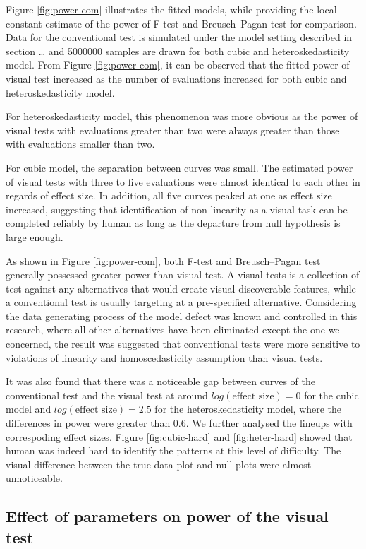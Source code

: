 \documentclass[]{interact}
\theoremstyle{plain}%
\theoremstyle{definition}
\theoremstyle{remark}
\begin{document}
Figure \ref{fig:power-com} illustrates the fitted models, while
providing the local constant estimate of the power of F-test and
Breusch--Pagan test for comparison. Data for the conventional test is
simulated under the model setting described in section \ldots{} and
5000000 samples are drawn for both cubic and heteroskedasticity model.
From Figure \ref{fig:power-com}, it can be observed that the fitted
power of visual test increased as the number of evaluations increased
for both cubic and heteroskedasticity model.

For heteroskedasticity model, this phenomenon was more obvious as the
power of visual tests with evaluations greater than two were always
greater than those with evaluations smaller than two.

For cubic model, the separation between curves was small. The estimated
power of visual tests with three to five evaluations were almost
identical to each other in regards of effect size. In addition, all five
curves peaked at one as effect size increased, suggesting that
identification of non-linearity as a visual task can be completed
reliably by human as long as the departure from null hypothesis is large
enough.

As shown in Figure \ref{fig:power-com}, both F-test and Breusch--Pagan
test generally possessed greater power than visual test. A visual tests
is a collection of test against any alternatives that would create
visual discoverable features, while a conventional test is usually
targeting at a pre-specified alternative. Considering the data
generating process of the model defect was known and controlled in this
research, where all other alternatives have been eliminated except the
one we concerned, the result was suggested that conventional tests were
more sensitive to violations of linearity and homoscedasticity
assumption than visual tests.

It was also found that there was a noticeable gap between curves of the
conventional test and the visual test at around
\(log(\text{effect size}) = 0\) for the cubic model and
\(log(\text{effect size}) = 2.5\) for the heteroskedasticity model,
where the differences in power were greater than 0.6. We further
analysed the lineups with correspoding effect sizes. Figure
\ref{fig:cubic-hard} and \ref{fig:heter-hard} showed that human was
indeed hard to identify the patterns at this level of difficulty. The
visual difference between the true data plot and null plots were almost
unnoticeable.

\hypertarget{effect-of-parameters-on-power-of-the-visual-test}{%
\subsection{Effect of parameters on power of the visual
test}\label{effect-of-parameters-on-power-of-the-visual-test}}
\end{document}

